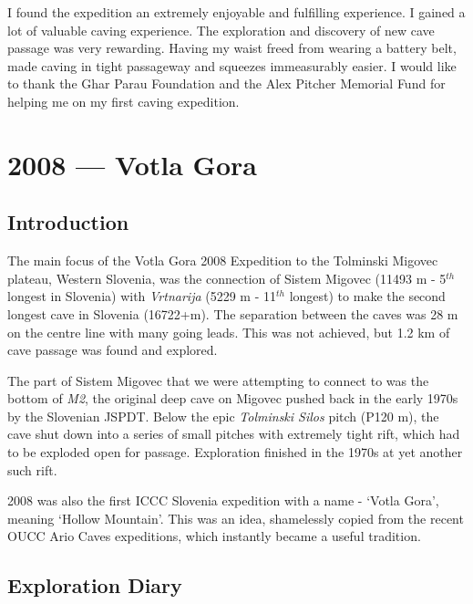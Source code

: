 I found the expedition an extremely enjoyable and fulfilling experience.
I gained a lot of valuable caving experience. The exploration and
discovery of new cave passage was very rewarding. Having my waist freed
from wearing a battery belt, made caving in tight passageway and
squeezes immeasurably easier. I would like to thank the Ghar Parau
Foundation and the Alex Pitcher Memorial Fund for helping me on my first
caving expedition.


\hypertarget{votla-gora}{%
\chapter{2008 --- Votla Gora}\label{votla-gora}}

\hypertarget{introduction-1}{%
\section{Introduction}\label{introduction-1}}

The main focus of the Votla Gora 2008 Expedition to the Tolminski
Migovec plateau, Western Slovenia, was the connection of Sistem Migovec
(11493 m - 5\(^{th}\) longest in Slovenia) with \emph{Vrtnarija} (5229 m
- 11\(^{th}\) longest) to make the second longest cave in Slovenia
(16722+m). The separation between the caves was 28 m on the centre line
with many going leads. This was not achieved, but 1.2 km of cave passage
was found and explored.

The part of Sistem Migovec that we were attempting to connect to was the
bottom of \emph{M2}, the original deep cave on Migovec pushed back in
the early 1970s by the Slovenian JSPDT. Below the epic \emph{Tolminski
Silos} pitch (P120 m), the cave shut down into a series of small pitches
with extremely tight rift, which had to be exploded open for passage.
Exploration finished in the 1970s at yet another such rift.

2008 was also the first ICCC Slovenia expedition with a name - `Votla
Gora', meaning `Hollow Mountain'. This was an idea, shamelessly copied
from the recent OUCC Ario Caves expeditions, which instantly became a
useful tradition.

\hypertarget{exploration-diary}{%
\section{Exploration Diary}\label{exploration-diary}}

